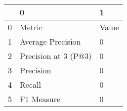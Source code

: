 \begin{tabular}{lll}
\toprule
{} &                     0 &      1 \\
\midrule
0 &                Metric &  Value \\
1 &     Average Precision &      0 \\
2 &  Precision at 3 (P@3) &      0 \\
3 &             Precision &      0 \\
4 &                Recall &      0 \\
5 &            F1 Measure &      0 \\
\bottomrule
\end{tabular}
